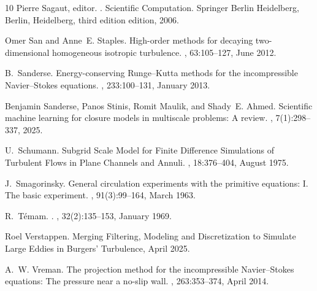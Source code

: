 \documentclass[preprint,twocolumn,5p]{elsarticle}
\begin{document}
\begin{thebibliography}{10}
Pierre Sagaut, editor.
.
\newblock Scientific {{Computation}}. Springer Berlin Heidelberg, Berlin, Heidelberg, third edition edition, 2006.

Omer San and Anne~E. Staples.
\newblock High-order methods for decaying two-dimensional homogeneous isotropic turbulence.
, 63:105--127, June 2012.

B.~Sanderse.
\newblock Energy-conserving {{Runge}}--{{Kutta}} methods for the incompressible {{Navier}}--{{Stokes}} equations.
, 233:100--131, January 2013.

Benjamin Sanderse, Panos Stinis, Romit Maulik, and Shady~E. Ahmed.
\newblock Scientific machine learning for closure models in multiscale problems: {{A}} review.
, 7(1):298--337, 2025.

U.~Schumann.
\newblock Subgrid {{Scale Model}} for {{Finite Difference Simulations}} of {{Turbulent Flows}} in {{Plane Channels}} and {{Annuli}}.
, 18:376--404, August 1975.

J.~Smagorinsky.
\newblock General circulation experiments with the primitive equations: {{I}}. {{The}} basic experiment.
, 91(3):99--164, March 1963.

R.~T{\'e}mam.
.
, 32(2):135--153, January 1969.

Roel Verstappen.
\newblock Merging {{Filtering}}, {{Modeling}} and {{Discretization}} to {{Simulate Large Eddies}} in {{Burgers}}' {{Turbulence}}, April 2025.

A.~W. Vreman.
\newblock The projection method for the incompressible {{Navier}}--{{Stokes}} equations: {{The}} pressure near a no-slip wall.
, 263:353--374, April 2014.


\end{thebibliography}
\end{document}
